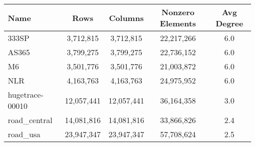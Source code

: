 \begin{tabular}[c]{| l | c | c | c | c |} 
\hline 
Name & Rows & Columns & Nonzero Elements & Avg Degree \\ \hline
333SP & 3,712,815 & 3,712,815 & 22,217,266 & 6.0 \\ \hline
AS365 & 3,799,275 & 3,799,275 & 22,736,152 & 6.0 \\ \hline
M6 & 3,501,776 & 3,501,776 & 21,003,872 & 6.0 \\ \hline
NLR & 4,163,763 & 4,163,763 & 24,975,952 & 6.0 \\ \hline
hugetrace-00010 & 12,057,441 & 12,057,441 & 36,164,358 & 3.0 \\ \hline
road\_central & 14,081,816 & 14,081,816 & 33,866,826 & 2.4 \\ \hline
road\_usa & 23,947,347 & 23,947,347 & 57,708,624 & 2.5 \\ \hline
\end{tabular}
